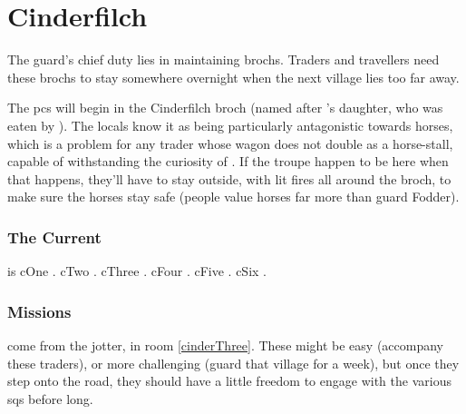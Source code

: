 \section{Cinderfilch }
\label{cinderfilch}



\begin{multicols}{2}

\noindent
The \gls{guard}'s chief duty lies in maintaining \glspl{broch}.
Traders and travellers need these \glspl{broch} to stay somewhere overnight when the next \gls{village} lies too far away.

The \glspl{pc} will begin in the Cinderfilch \gls{broch} (named after 's daughter, who was eaten by ).
The locals know it as being particularly antagonistic towards horses, which is a problem for any trader whose wagon does not double as a horse-stall, capable of withstanding the curiosity of .
If the troupe happen to be here when that happens, they'll have to stay outside, with lit fires all around the \gls{broch}, to make sure the horses stay safe (people value horses far more than \gls{guard} Fodder).

\subsubsection{The Current }
is
\ifcase\value{cycle}%
  \gls{cOne}
  .
\or%
  \gls{cTwo}
  .
\or%
  \gls{cThree}
  .
\or%
  \gls{cFour}
  .
\or%
  \gls{cFive}
  .
\else%
  \gls{cSix}
  .
\fi%

\subsubsection{Missions}
come from the \gls{jotter}, in room \ref{cinderThree}.%
These might be easy (accompany these traders), or more challenging (guard that \gls{village} for a week), but once they step onto the road, they should have a little freedom to engage with the various \glspl{sq} before long.


\end{multicols}
